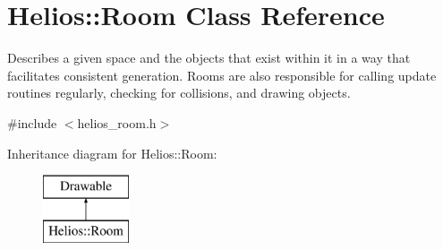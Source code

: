 \hypertarget{class_helios_1_1_room}{}\section{Helios\+:\+:Room Class Reference}
\label{class_helios_1_1_room}


Describes a given space and the objects that exist within it in a way that facilitates consistent generation. Rooms are also responsible for calling update routines regularly, checking for collisions, and drawing objects.  




{\ttfamily \#include $<$helios\+\_\+room.\+h$>$}

Inheritance diagram for Helios\+:\+:Room\+:\begin{figure}[H]
\begin{center}
\leavevmode
\includegraphics[height=2.000000cm]{class_helios_1_1_room}
\end{center}
\end{figure}
